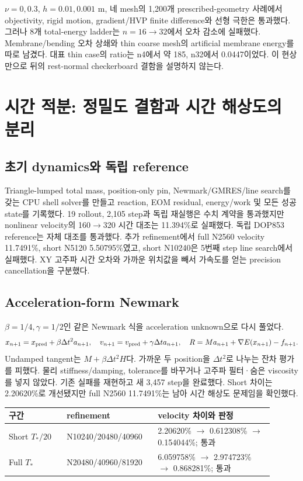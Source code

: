 \documentclass[10pt]{article}
\begin{document}
\(\nu=0,0.3\), \(h=0.01,0.001\) m, 네 mesh의 1,200개 prescribed-geometry 사례에서
objectivity, rigid motion, gradient/HVP finite difference와 선형 극한은 통과했다.
그러나 8개 total-energy ladder는 \(n=16\to32\)에서 오차 감소에 실패했다.
Membrane/bending 오차 상쇄와 thin coarse mesh의 artificial membrane energy를 따로 남겼다.
대표 thin case의 ratio는 n4에서 약 185, n32에서 0.0447이었다.
이 현상만으로 뒤의 rest-normal checkerboard 결함을 설명하지 않는다.

\section{시간 적분: 정밀도 결함과 시간 해상도의 분리}

\subsection{초기 dynamics와 독립 reference}

Triangle-lumped total mass, position-only pin, Newmark/GMRES/line search를 갖는 CPU shell solver를
만들고 reaction, EOM residual, energy/work 및 모든 성공 state를 기록했다.
19 rollout, 2,105 step과 독립 재실행은 수치 계약을 통과했지만 nonlinear velocity의
160$\to$320 시간 대조는 11.394\%로 실패했다.
독립 DOP853 reference는 자체 대조를 통과했다.
추가 refinement에서 full N2560 velocity 11.7491\%, short N5120 5.50795\%였고,
short N10240은 5번째 step line search에서 실패했다. XY 고주파 시간 오차와
가까운 위치값을 빼서 가속도를 얻는 precision cancellation을 구분했다.

\subsection{Acceleration-form Newmark}

\(\beta=1/4,\gamma=1/2\)인 같은 Newmark 식을 acceleration unknown으로 다시 풀었다.
\[
 x_{n+1}=x_{\rm pred}+\beta\Delta t^2a_{n+1},\quad
 v_{n+1}=v_{\rm pred}+\gamma\Delta t a_{n+1},\quad
 R=Ma_{n+1}+\nabla E(x_{n+1})-f_{n+1}.
\]
Undamped tangent는 \(M+\beta\Delta t^2H\)다. 가까운 두 position을
\(\Delta t^2\)로 나누는 잔차 평가를 피했다. 물리 stiffness/damping, tolerance를 바꾸거나
고주파 필터·숨은 viscosity를 넣지 않았다. 기존 실패를 재현하고 새 3,457 step을 완료했다.
Short 차이는 2.20620\%로 개선됐지만 full N2560 11.7491\%는 남아 시간 해상도 문제임을 확인했다.

\begin{longtable}{L{0.20\linewidth}L{0.30\linewidth}L{0.40\linewidth}}
\toprule 구간 & refinement & velocity 차이와 판정\\\midrule
Short \(T_*/20\) & N10240/20480/40960 & 2.20620\% $\to$ 0.612308\% $\to$ 0.154044\%; 통과\\
Full \(T_*\) & N20480/40960/81920 & 6.059758\% $\to$ 2.974723\% $\to$ 0.868281\%; 통과\\
\bottomrule\end{longtable}
\end{document}
